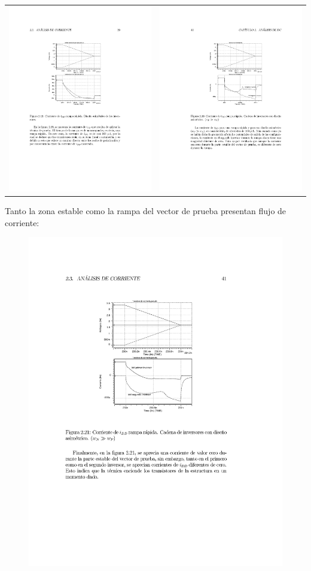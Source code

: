 \documentclass[
paper=128mm:96mm, %
fontsize=11pt, %
pagesize, %
parskip=half-, %
]{scrartcl} %
\theoremstyle{mythmstyle} %
\begin{document}
\begin{table}[ht]
\centering
\begin{tabular}{cc}
\includegraphics[width=0.35\linewidth]{iddAnalysisCuasiSimetrico}&\includegraphics[width=0.35\linewidth]{iddAnalysisAsimetrico}\\
\end{tabular}
\label{tab:gt}
\end{table}

\clearpage

Tanto la zona estable como la rampa del vector de prueba presentan
flujo de corriente:

\begin{figure}[h]
  \centering\includegraphics[width=0.35\linewidth]{iddAnalysisAsimetrico2}
\end{figure}
\end{document}
